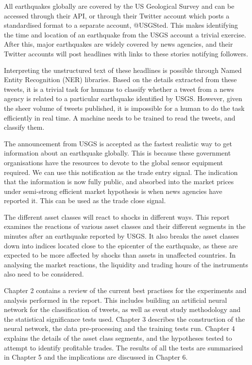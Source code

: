 All earthquakes globally are covered by the US Geological Survey and can be accessed through their API, or through their Twitter account which posts a standardised format to a separate account, @USGSted.  This makes identifying the time and location of an earthquake from the USGS account a trivial exercise. After this, major earthquakes are widely covered by news agencies, and their Twitter accounts will post headlines with links to these stories notifying followers.

Interpreting the unstructured text of these headlines is possible through Named Entity Recognition (NER) libraries. Based on the details extracted from these tweets, it is a trivial task for humans to classify whether a tweet from a news agency is related to a particular earthquake identified by USGS. However, given the sheer volume of tweets published, it is impossible for a human to do the task efficiently in real time. A machine needs to be trained to read the tweets, and classify them.

The announcement from USGS is accepted as the fastest realistic way to get information about an earthquake globally\cite{earthquake_flow}. This is because these government organisations have the resources to devote to the global sensor equipment required. We can use this notification as the trade entry signal. The indication that the information is now fully public, and absorbed into the market prices under semi-strong efficient market hypothesis\cite{efficient_markets} is when news agencies have reported it. This can be used as the trade close signal.

The different asset classes will react to shocks in different ways. This report examines the reactions of various asset classes and their different segments in the minutes after an earthquake reported by USGS. It also breaks the asset classes down into indices located close to the epicenter of the earthquake, as these are expected to be more affected by shocks than assets in unaffected countries. In analysing the market reactions, the liquidity and trading hours of the instruments also need to be considered.

Chapter 2 contains a review of the current best practises for the experiments and analysis performed in the report. This includes building an artificial neural network for the classification of tweets, as well as event study methodology and the statistical significance tests used. Chapter 3 describes the construction of the neural network, the data pre-processing and the training tests run. Chapter 4 explains the details of the asset class segments, and the hypotheses tested to attempt to identify profitable trades. The results of all the tests are summarised in Chapter 5 and the implications are discussed in Chapter 6.



